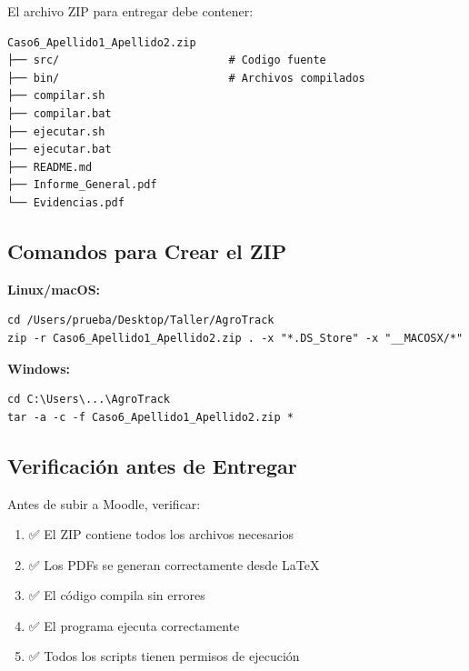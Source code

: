 \documentclass[12pt,a4paper]{article}
\begin{document}
El archivo ZIP para entregar debe contener:

\begin{tcolorbox}[colback=gray!5,colframe=gray!75!black,title=\textbf{Estructura del ZIP}]
\begin{lstlisting}[style=bashstyle,basicstyle=\ttfamily\small]
Caso6_Apellido1_Apellido2.zip
├── src/                          # Codigo fuente
├── bin/                          # Archivos compilados
├── compilar.sh
├── compilar.bat
├── ejecutar.sh
├── ejecutar.bat
├── README.md
├── Informe_General.pdf
└── Evidencias.pdf
\end{lstlisting}
\end{tcolorbox}

\subsection{Comandos para Crear el ZIP}

\textbf{Linux/macOS:}
\begin{lstlisting}[style=bashstyle]
cd /Users/prueba/Desktop/Taller/AgroTrack
zip -r Caso6_Apellido1_Apellido2.zip . -x "*.DS_Store" -x "__MACOSX/*"
\end{lstlisting}

\textbf{Windows:}
\begin{lstlisting}[style=bashstyle]
cd C:\Users\...\AgroTrack
tar -a -c -f Caso6_Apellido1_Apellido2.zip *
\end{lstlisting}

\subsection{Verificación antes de Entregar}

Antes de subir a Moodle, verificar:

\begin{enumerate}
    \item ✅ El ZIP contiene todos los archivos necesarios
    \item ✅ Los PDFs se generan correctamente desde LaTeX
    \item ✅ El código compila sin errores
    \item ✅ El programa ejecuta correctamente
    \item ✅ Todos los scripts tienen permisos de ejecución
\end{enumerate}

\end{document}
